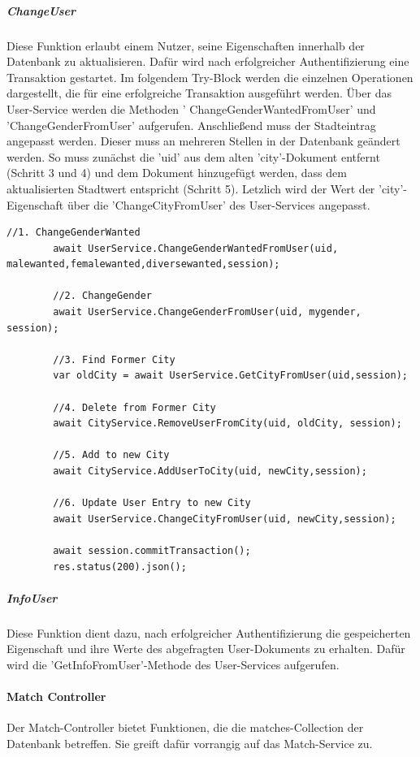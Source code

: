 \subparagraph{ChangeUser}
Diese Funktion erlaubt einem Nutzer, seine Eigenschaften innerhalb der Datenbank zu aktualisieren. Dafür wird nach erfolgreicher Authentifizierung eine Transaktion gestartet. Im folgendem Try-Block werden die einzelnen Operationen dargestellt, die für eine erfolgreiche Transaktion ausgeführt werden. Über das User-Service werden die Methoden ' ChangeGenderWantedFromUser' und 'ChangeGenderFromUser' aufgerufen. Anschließend muss der Stadteintrag angepasst werden. 
Dieser muss an mehreren Stellen in der Datenbank geändert werden. 
So muss zunächst die 'uid' aus dem alten 'city'-Dokument entfernt (Schritt 3 und 4) und dem  Dokument hinzugefügt werden, dass dem aktualisierten Stadtwert entspricht (Schritt 5). Letzlich wird der Wert der 'city'-Eigenschaft über die 'ChangeCityFromUser' des User-Services angepasst.

\begin{lstlisting}[caption=UserController - Change User, label=lst:UserControlleruserchange]
        //1. ChangeGenderWanted
        await UserService.ChangeGenderWantedFromUser(uid, malewanted,femalewanted,diversewanted,session);

        //2. ChangeGender
        await UserService.ChangeGenderFromUser(uid, mygender, session);

        //3. Find Former City
        var oldCity = await UserService.GetCityFromUser(uid,session);

        //4. Delete from Former City
        await CityService.RemoveUserFromCity(uid, oldCity, session);

        //5. Add to new City
        await CityService.AddUserToCity(uid, newCity,session);

        //6. Update User Entry to new City
        await UserService.ChangeCityFromUser(uid, newCity,session);

        await session.commitTransaction();
        res.status(200).json();
\end{lstlisting}
  
\subparagraph{InfoUser}     
Diese Funktion dient dazu, nach erfolgreicher Authentifizierung die gespeicherten Eigenschaft und ihre Werte des abgefragten User-Dokuments zu erhalten. Dafür wird die 'GetInfoFromUser'-Methode des User-Services aufgerufen.
        

%
%


\paragraph{Match Controller}
Der Match-Controller bietet Funktionen, die die matches-Collection der Datenbank betreffen. Sie greift dafür vorrangig auf das Match-Service zu.

